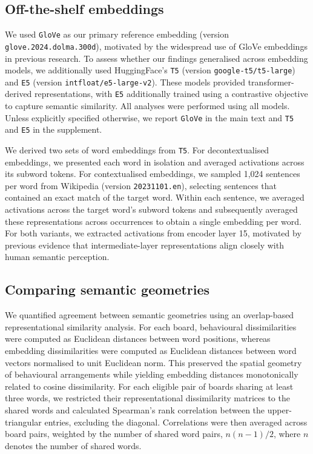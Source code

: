 \documentclass[pdflatex,sn-mathphys]{sn-jnl}
\begin{document}
\subsection{Off-the-shelf embeddings}\label{embeddings}
We used \texttt{GloVe}\cite{glove} as our primary reference embedding (version \texttt{glove.2024.dolma.300d}), motivated by the widespread use of GloVe embeddings in previous research\cite{Caliskan2017,Gentzkow2019,Garg2017,Heilbronetal2022,Huth2016,Schneider2026}. To assess whether our findings generalised across embedding models, we additionally used HuggingFace's \texttt{T5}\cite{t5-large} (version \texttt{google-t5/t5-large}) and \texttt{E5}\cite{e5-large} (version \texttt{intfloat/e5-large-v2}). These models provided transformer-derived representations, with \texttt{E5} additionally trained using a contrastive objective to capture semantic similarity. All analyses were performed using all models. Unless explicitly specified otherwise, we report \texttt{GloVe} in the main text and \texttt{T5} and \texttt{E5} in the supplement.

We derived two sets of word embeddings from \texttt{T5}. For decontextualised embeddings, we presented each word in isolation and averaged activations across its subword tokens. For contextualised embeddings, we sampled 1,024 sentences per word from Wikipedia (version \texttt{20231101.en}), selecting sentences that contained an exact match of the target word. Within each sentence, we averaged activations across the target word's subword tokens and subsequently averaged these representations across occurrences to obtain a single embedding per word. For both variants, we extracted activations from encoder layer 15, motivated by previous evidence that intermediate-layer representations align closely with human semantic perception\cite{Caucheteux2022}.

\subsection{Comparing semantic geometries}\label{geometries}
We quantified agreement between semantic geometries using an overlap-based representational similarity analysis. For each board, behavioural dissimilarities were computed as Euclidean distances between word positions, whereas embedding dissimilarities were computed as Euclidean distances between word vectors normalised to unit Euclidean norm. This preserved the spatial geometry of behavioural arrangements while yielding embedding distances monotonically related to cosine dissimilarity. For each eligible pair of boards sharing at least three words, we restricted their representational dissimilarity matrices to the shared words and calculated Spearman's rank correlation between the upper-triangular entries, excluding the diagonal. Correlations were then averaged across board pairs, weighted by the number of shared word pairs, $n(n-1)/2$, where $n$ denotes the number of shared words.
\end{document}

